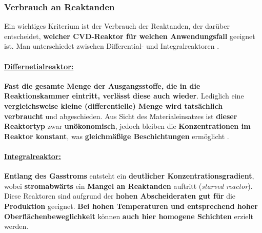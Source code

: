 \documentclass{article} %
\begin{document}


\vspace{1em}

\subsubsection{Verbrauch an Reaktanden} %

Ein wichtiges Kriterium ist der Verbrauch der Reaktanden, der darüber entscheidet, \textbf{welcher CVD-Reaktor für welchen Anwendungsfall} geeignet ist. Man unterschiedet zwischen Differential- und Integralreaktoren \cite{keplinger2024CVD}.

\vspace{0.0em}

\paragraph{\uline{Differnetialreaktor:}} \textbf{Fast die gesamte Menge der Ausgangsstoffe, die in die Reaktionskammer eintritt, verlässt diese auch wieder}. Lediglich eine \textbf{vergleichsweise kleine (differentielle) Menge wird tatsächlich verbraucht} und abgeschieden. Aus Sicht des Materialeinsatzes ist \textbf{dieser Reaktortyp} zwar \textbf{unökonomisch}, jedoch bleiben die \textbf{Konzentrationen im Reaktor konstant}, was \textbf{gleichmäßige Beschichtungen} ermöglicht \cite{keplinger2024CVD}.

\vspace{0.0em}

\paragraph{\uline{Integralreaktor:}} \textbf{Entlang des Gasstroms} entsteht ein \textbf{deutlicher Konzentrationsgradient}, wobei \textbf{stromabwärts} ein \textbf{Mangel an Reaktanden} auftritt (\textit{starved reactor}). Diese Reaktoren sind aufgrund der \textbf{hohen Abscheideraten gut für} die \textbf{Produktion} geeignet. \textbf{Bei hohen Temperaturen und entsprechend hoher Oberflächenbeweglichkeit} können \textbf{auch hier homogene Schichten} erzielt werden.



\end{document}

